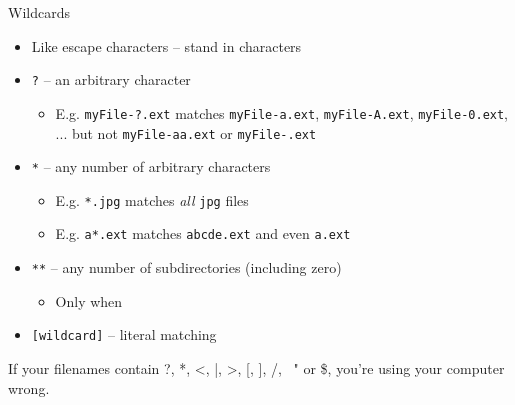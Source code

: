 \begin{frame}{Wildcards}
%
\begin{itemize}
\item Like escape characters -- stand in characters
\item \texttt{?} -- an arbitrary character
	\begin{itemize}
	\item E.\;g. \texttt{myFile-?.ext} matches \texttt{myFile-a.ext}, \texttt{myFile-A.ext}, \texttt{myFile-0.ext}, ... but not \texttt{myFile-aa.ext} or
	\texttt{myFile-.ext}
	\end{itemize}
\item \texttt{*} -- any number of arbitrary characters
	\begin{itemize}
	\item E.\;g. \texttt{*.jpg} matches \emph{all} \texttt{jpg} files
	\item E.\;g. \texttt{a*.ext} matches \texttt{abcde.ext} and even \texttt{a.ext}
	\end{itemize}
\item \texttt{**} -- any number of subdirectories (including zero)
	\begin{itemize}
	\item Only when 
	\end{itemize}
\item \texttt{[wildcard]} -- literal matching
\end{itemize}
%
\begin{hintbox}
If your filenames contain ?, *, <, |, >, [, ], /, \, " or \$, you're using your computer wrong.
\end{hintbox}
%
\end{frame}


